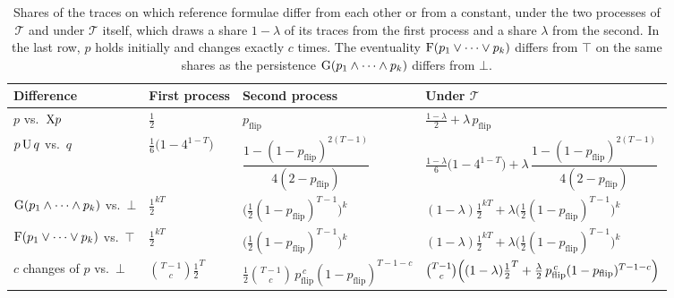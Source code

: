 \documentclass[titlepage,a4paper,11pt]{report}
\begin{document}
    \begin{table}[ht]
        \centering
        \caption{Shares of the traces on which reference formulae differ from each other or from a constant, under the two processes of $\mathcal T$ and under $\mathcal T$ itself, which draws a share $1-\lambda$ of its traces from the first process and a share $\lambda$ from the second. In the last row, $p$ holds initially and changes exactly $c$ times. The eventuality $\text{F}(p_1\lor\dots\lor p_k)$ differs from $\top$ on the same shares as the persistence $\text{G}(p_1\land\dots\land p_k)$ differs from $\bot$.
        \vspace{15pt}}
        \label{tab:reference_shares}
        \begin{tabular}{llll}
            \toprule
            Difference & First process & Second process & Under $\mathcal T$ \\
            \midrule
            $p$ vs.\ $\text{X} p$ & $\frac12$ & $p_{\text{flip}}$ & $\frac{1-\lambda}{2}+\lambda\,p_{\text{flip}}$ \\[4pt]
            $p\,\text{U}\,q$ vs.\ $q$ & $\frac16\bigl(1-4^{1-T}\bigr)$ & $\dfrac{1-(1-p_{\text{flip}})^{2(T-1)}}{4(2-p_{\text{flip}})}$ & $\frac{1-\lambda}{6}\bigl(1-4^{1-T}\bigr)+\lambda\,\dfrac{1-(1-p_{\text{flip}})^{2(T-1)}}{4(2-p_{\text{flip}})}$ \\[10pt]
            $\text{G}(p_1\land\dots\land p_k)$ vs.\ $\bot$ & $\frac12^{kT}$ & $\bigl(\frac12(1-p_{\text{flip}})^{T-1}\bigr)^k$ & $(1-\lambda)\frac12^{kT}+\lambda\bigl(\frac12(1-p_{\text{flip}})^{T-1}\bigr)^k$ \\[4pt]
            $\text{F}(p_1\lor\dots\lor p_k)$ vs.\ $\top$ & $\frac12^{kT}$ & $\bigl(\frac12(1-p_{\text{flip}})^{T-1}\bigr)^k$ & $(1-\lambda)\frac12^{kT}+\lambda\bigl(\frac12(1-p_{\text{flip}})^{T-1}\bigr)^k$ \\[4pt]
            $c$ changes of $p$ vs.\ $\bot$ & $\binom{T-1}{c}\frac12^{T}$ & $\frac12\binom{T-1}{c}\,p_{\text{flip}}^{\,c}(1-p_{\text{flip}})^{T-1-c}$ & $\binom{T-1}{c}\Bigl((1-\lambda)\frac12^{T}+\frac\lambda2\,p_{\text{flip}}^{\,c}(1-p_{\text{flip}})^{T-1-c}\Bigr)$ \\
            \bottomrule
        \end{tabular}
    \end{table}
\end{document}
